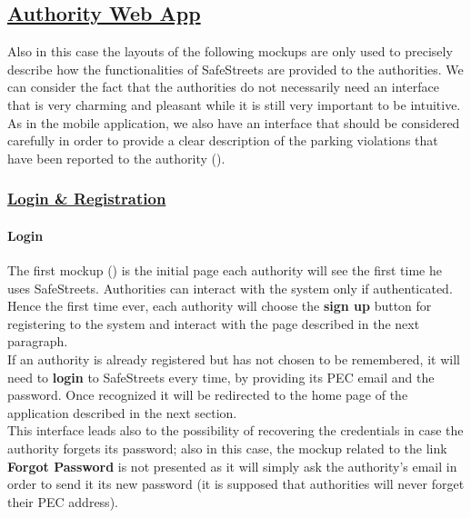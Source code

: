 		\subsection[Authority Web App]{\hyperlink{toc}{Authority Web App}}
			\label{sec:authorityWebApp}
			
			Also in this case the layouts of the following mockups are only used to precisely describe how the functionalities of SafeStreets are provided to the authorities. We can consider the fact that the authorities do not necessarily need an interface that is very charming and pleasant while it is still very important to be intuitive. As in the mobile application, we also have an interface that should be considered carefully in order to provide a clear description of the parking violations that have been reported to the authority ().
			
			\subsubsection[Login \& Registration]{\hyperlink{toc}{Login \& Registration}}
				\label{sec:authorityLoginRegistration}
				
				\paragraph{Login}
				The first mockup () is the initial page each authority will see the first time he uses SafeStreets. Authorities can interact with the system only if authenticated. Hence the first time ever, each authority will choose the \textbf{sign up} button for registering to the system and interact with the page described in the next paragraph.\\
				
				If an authority is already registered but has not chosen to be remembered, it will need to \textbf{login} to SafeStreets every time, by providing its PEC email and the password. Once recognized it will be redirected to the home page of the application described in the next section.\\
				
				This interface leads also to the possibility of recovering the credentials in case the authority forgets its password; also in this case, the mockup related to the link \textbf{Forgot Password} is not presented as it will simply ask the authority's email in order to send it its new password (it is supposed that authorities will never forget their PEC address).
				
